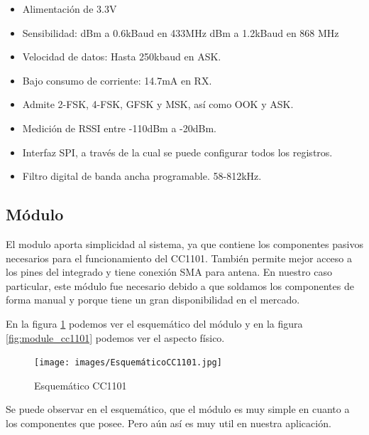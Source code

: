 \begin{itemize}
    \item Alimentación de 3.3V
    \item Sensibilidad: 
     dBm a 0.6kBaud en 433MHz
     dBm a 1.2kBaud en 868 MHz
    \item Velocidad de datos: Hasta 250kbaud en ASK.
    \item Bajo consumo de corriente: 14.7mA en RX.
    \item Admite 2-FSK, 4-FSK, GFSK y MSK, así como OOK y ASK.
    \item Medición de RSSI entre -110dBm a -20dBm.
    \item Interfaz SPI, a través de la cual se puede configurar todos los registros.
    \item Filtro digital de banda ancha programable. 58-812kHz.
\end{itemize}

\subsection{Módulo}

El modulo aporta simplicidad al sistema, ya que contiene los componentes pasivos necesarios para el funcionamiento del CC1101. También permite mejor acceso a los pines 
del integrado y tiene conexión SMA para antena. En nuestro caso particular, este módulo fue necesario debido a que soldamos los componentes de forma manual y porque
tiene un gran disponibilidad en el mercado.

En la figura \ref{fig:sch_cc1101} podemos ver el esquemático del módulo y en la figura \ref{fig:module_cc1101} podemos ver el aspecto físico.

\begin{figure}[htb]
	\centering
	\texttt{[image: images/EsquemáticoCC1101.jpg]}
    \caption{Esquemático CC1101}
	\label{fig:sch_cc1101}
\end{figure}

Se puede observar en el esquemático, que el módulo es muy simple en cuanto a los componentes que posee. Pero aún así es muy util en nuestra aplicación.

